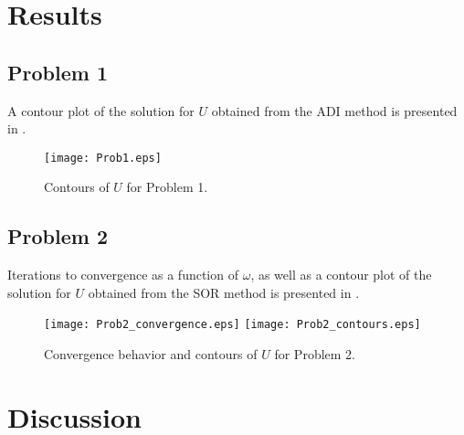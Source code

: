 \documentclass[11pt]{article}
\begin{document}
\section{Results} %

\subsection{Problem 1}

A contour plot of the solution for $U$ obtained from the ADI method is presented in .

\begin{figure}[h!]
\begin{center}
\texttt{[image: Prob1.eps]}
\\[0.5cm]
\caption{Contours of $U$ for Problem 1.}
\label{fig:Prob1}
\end{center}
\end{figure}

\subsection{Problem 2}

Iterations to convergence as a function of $\omega$, as well as a contour plot of the solution for $U$ obtained from the SOR method is presented in .

\begin{figure}[h!]
\begin{center}
\texttt{[image: Prob2\_convergence.eps]}
\texttt{[image: Prob2\_contours.eps]}
\\[0.5cm]
\caption{Convergence behavior and contours of $U$ for Problem 2.}
\label{fig:Prob2}
\end{center}
\end{figure}

\section{Discussion} %
\end{document}
